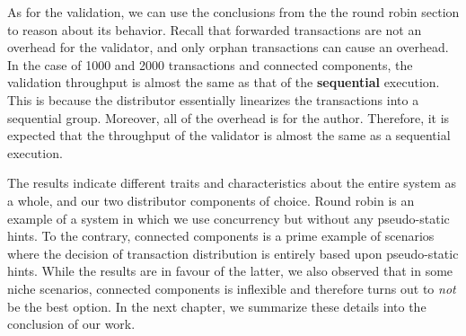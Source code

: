 As for the validation, we can use the conclusions from the the round robin section to reason about
its behavior. Recall that forwarded transactions are not an overhead for the validator, and only
orphan transactions can cause an overhead. In the case of 1000 and 2000 transactions and connected
components, the validation throughput is almost the same as that of the \textbf{sequential}
execution. This is because the distributor essentially linearizes the transactions into a sequential
group. Moreover, all of the overhead is for the author. Therefore, it is expected that the
throughput of the validator is almost the same as a sequential execution.

The results indicate different traits and characteristics about the entire system as a whole, and
our two distributor components of choice. Round robin is an example of a system in which we use
concurrency but without any pseudo-static hints. To the contrary, connected components is a prime
example of scenarios where the decision of transaction distribution is entirely based upon
pseudo-static hints. While the results are in favour of the latter, we also observed that in some
niche scenarios, connected components is inflexible and therefore turns out to \textit{not} be the
best option. In the next chapter, we summarize these details into the conclusion of our work.
